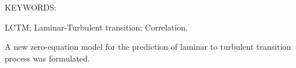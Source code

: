 
\abstract

\noindent KEYWORDS: \hspace*{0.5em} \parbox[t]{4.4in}{LCTM;
  Laminar-Turbulent transition; Correlation.}

\vspace*{24pt}

\noindent 
A new zero-equation model for the prediction of laminar to turbulent transition
process was formulated. 


\pagebreak


